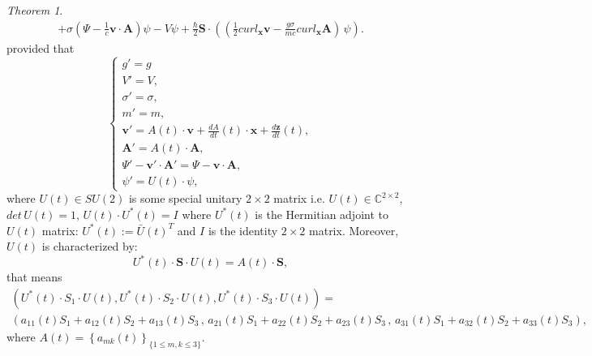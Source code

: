 \documentclass{article}
\newtheorem{theorem}{Theorem}[section]
\theoremstyle{definition}
\theoremstyle{remark}
\renewcommand{\vec}[1]{\mathbf{#1}}
\newtheorem{theorem}{Theorem}
\begin{document}
\begin{theorem}
\begin{multline}
+\sigma\left(\Psi-\frac{1}{c}\vec v\cdot\vec
A\right)\psi-V\psi+\frac{\hbar}{2}\vec
S\cdot\left(\left(\frac{1}{2}curl_{\vec x}\vec
v-\frac{g\sigma}{mc}curl_{\vec x}\vec A\right)\,\psi\right).
\end{multline}
provided that
\begin{equation}\label{yuythfgfyftydtydtydtyddyyyhhddhhhredPPN111hgghjgintintrrZZ}
\begin{cases}
g'=g\\
V'=V,\\
\sigma'=\sigma,\\
m'=m,\\
\vec v'=A(t)\cdot \vec v+\frac{dA}{dt}(t)\cdot\vec x+\frac{d\vec z}{dt}(t),\\
\vec A'=A(t)\cdot \vec A,\\
\Psi'-\vec v'\cdot\vec A'=\Psi-\vec v\cdot\vec A,\\
\psi'=U(t)\cdot\psi,
\end{cases}
\end{equation}
where $U(t)\in SU(2)$ is some special unitary $2\times 2$ matrix
i.e. $U(t)\in\mathbb{C}^{2\times 2}$, $det\,U(t)=1$, $U(t)\cdot
U^*(t)=I$ where $U^*(t)$ is the Hermitian adjoint to $U(t)$ matrix:
$U^*(t):=\bar U(t)^T$ and $I$ is the identity $2\times 2$ matrix.
Moreover, $U(t)$ is characterized by:
\begin{equation}\label{gyfyfgfgfgghZZ}
U^*(t)\cdot\vec S\cdot U(t)=A(t)\cdot\vec S,
\end{equation}
that means
\begin{multline*}
\left(U^*(t)\cdot S_1\cdot U(t),U^*(t)\cdot S_2\cdot
U(t),U^*(t)\cdot S_3\cdot U(t)\right)=\\
\left(a_{11}(t)S_1+a_{12}(t)S_2+a_{13}(t)S_3\,,\,a_{21}(t)S_1+a_{22}(t)S_2+a_{23}(t)S_3\,,\,a_{31}(t)S_1+a_{32}(t)S_2+a_{33}(t)S_3\right),
\end{multline*}
where $A(t)=\left\{a_{mk}(t)\right\}_{\{1\leq m,k\leq 3\}}$.
\end{theorem}
\end{document}
